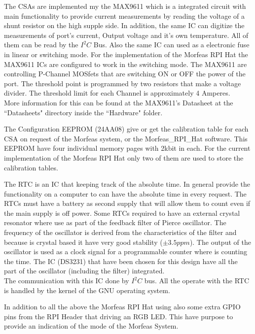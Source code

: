 The CSAs are implemented my the MAX9611 which is a integrated circuit with main functionality to provide current measurements by reading the voltage of a shunt resistor on the high supple side.
In addition, the same IC can digitize the measurements of port's current, Output voltage and it's own temperature. All of them can be read by the $I^2C$ Bus.
Also the same IC can used as a electronic fuse in linear or switching mode. For the implementation of the Morfeas RPI Hat the MAX9611 ICs are configured to work in the switching mode.
The MAX9611 are controlling P-Channel MOSfets that are switching ON or OFF the power of the port.
The threshold point is programmed by two resistors that make a voltage divider. The threshold limit for each Channel is approximately 4 Amperes.\\
More information for this can be found at the MAX9611's Datasheet at the ``Datasheets" directory inside the ``Hardware" folder.

The Configuration EEPROM (24AA08) give or get the calibration table for each CSA on request of the Morfeas system, or the Morfeas\_RPI\_Hat software.
This EEPROM have four individual memory pages with 2kbit in each.
For the current implementation of the Morfeas RPI Hat only two of them are used to store the calibration tables.

The RTC is an IC that keeping track of the absolute time. In general provide the functionality on a computer to can have the absolute time in every request.
The RTCs must have a battery as second supply that will allow them to count even if the main supply is off power.
Some RTCs required to have an external crystal resonator where use as part of the feedback filter of Pierce oscillator.
The frequency of the oscillator is derived from the characteristics of the filter and because is crystal based it have very good stability ($\pm3.5ppm$).
The output of the oscillator is used as a clock signal for a programmable counter where is counting the time. The IC (DS3231) that have been chosen for this design have all the part of the oscillator (including the filter) integrated.\\
The communication with this IC done by $I^2C$ bus. All the operate with the RTC is handled by the kernel of the GNU operating system.

In addition to all the above the Morfeas RPI Hat using also some extra GPIO pins from the RPI Header that driving an RGB LED.
This have purpose to provide an indication of the mode of the Morfeas System.


